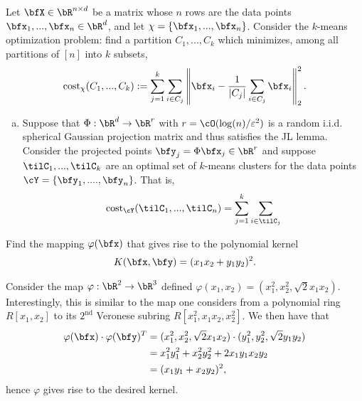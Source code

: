 \begin{homework}[e]
   Let $\bfX\in \bR^{n\times d}$ be a matrix whose $n$ rows are the data points $\bfx_1,...,\bfx_n \in \bR^d$, and let $\chi = \{\bfx_1,...,\bfx_n\}$. Consider the $k$-means optimization problem: find a partition $C_1,...,C_k$ which minimizes, among all partitions of $[n]$ into $k$ subsets,
  \begin{align*}
    \operatorname{cost}_{\chi}(C_1,...,C_k):= \sum_{j=1}^k\sum_{i \in C_j} \left\|\bfx_i - \frac{1}{|C_j|}\sum_{i\in C_j} \bfx_i\right\|^2_2.
  \end{align*}
  \begin{enumerate}[(a)]
    \item Suppose that $\Phi:\bR^d \to \bR^r$ with $r = \cO(\log(n)/\epsilon^2)$ is a random i.i.d. spherical Gaussian projection matrix and thus satisfies the JL lemma. Consider the projected points $\bfy_j = \Phi\bfx_j\in \bR^r$ and suppose $\tilC_1,...,\tilC_k$ are an optimal set of $k$-means clusters for the data points $\cY = \{\bfy_1,....,\bfy_n\}$. That is,
    \begin{align*}
      \operatorname{cost}_{\cY}(\tilC_1,...,\tilC_n) = \sum_{j=1}^k\sum_{i\in \tilC_j}
    \end{align*}
  \end{enumerate}
   Find the mapping $\varphi(\bfx)$ that gives rise to the polynomial kernel \begin{align*}
    K(\bfx, \bfy) = (x_1x_2 + y_1y_2)^2.
  \end{align*}
  \begin{prf}
    Consider the map $\varphi:\bR^2 \to \bR^3$ defined $\varphi(x_1,x_2) = (x_1^2, x_2^2, \sqrt{2}x_1x_2)$. Interestingly, this is similar to the map one considers from a polynomial ring $R[x_1,x_2]$ to its $2^{\text{nd}}$ Veronese subring $R[x_1^2,x_1x_2,x_2^2]$. We then have that
    \begin{align*}
      \varphi(\bfx)\cdot \varphi(\bfy)^T
        &= (x_1^2,x_2^2,\sqrt{2}x_1x_2) \cdot (y_1^2,y_2^2, \sqrt{2}y_1y_2) \\
        &= x_1^2y_1^2 + x_2^2y_2^2 + 2x_1y_1x_2y_2 \\
        &= (x_1y_1 + x_2y_2)^2,
    \end{align*}
    hence $\varphi$ gives rise to the desired kernel.
  \end{prf}
\end{homework}

